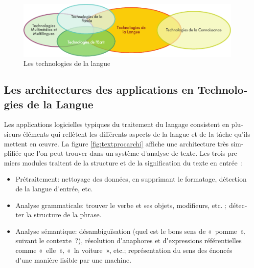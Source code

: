 \begin{french}
\begin{multicols}{2}
\begin{figure}[!ht]
\begin{center}
 \includegraphics[width=\textwidth]{../_media/french/language_technologies} 
\caption{Les technologies de la langue}
\label{fig:languagetechno}
\end{center}
\vspace*{-.2cm}
\end{figure}



\subsection{Les architectures des applications en Technologies de la Langue}

Les applications logicielles typiques du traitement du langage
consistent en plusieurs éléments qui reflètent les différents aspects
de la langue et de la tâche qu{\mbox '}ils mettent en œuvre. La figure \ref{fig:textprocarchi}  
 affiche une architecture très simplifiée que l{\mbox '}on peut trouver
dans un système d{\mbox '}analyse de texte. Les trois premiers modules
traitent de la structure et de la signification du texte en entrée~:
\begin{itemize}
\item Prétraitement: nettoyage des données, en supprimant le
  formatage, détection de la langue d{\mbox '}entrée, etc.

\item Analyse grammaticale: trouver le verbe et ses objets,
  modifieurs, etc. ; détecter la structure de la phrase.

\item Analyse sémantique: désambiguïsation (quel est le bons sens de
  «~pomme~», suivant le contexte~?), résolution d{\mbox '}anaphores et
  d{\mbox '}expressions référentielles comme «~elle~», «~la voiture~», etc.;
  représentation du sens des énoncés d{\mbox '}une manière lisible par une
  machine.
\end{itemize}


\end{multicols}
\end{french}
